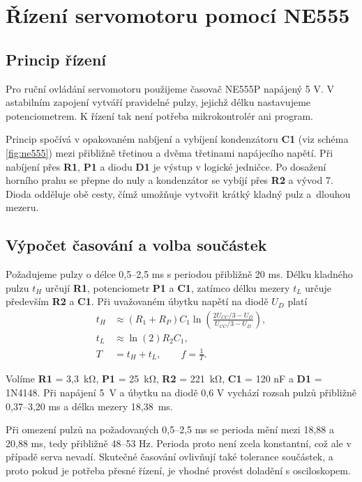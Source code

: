 \chapter{Řízení servomotoru pomocí NE555}
\label{chap:ne555}

\section{Princip řízení}

Pro ruční ovládání servomotoru použijeme časovač NE555P napájený 5 V. V astabilním zapojení vytváří pravidelné pulzy, jejichž délku nastavujeme potenciometrem. K řízení tak není potřeba mikrokontrolér ani program.~\cite{servo555prakticky,ne555}

Princip spočívá v opakovaném nabíjení a vybíjení kondenzátoru \textbf{C1} (viz schéma \ref{fig:ne555}) mezi přibližně třetinou a dvěma třetinami napájecího napětí. Při nabíjení přes \textbf{R1}, \textbf{P1} a diodu \textbf{D1} je výstup v logické jedničce. Po dosažení horního prahu se přepne do nuly a kondenzátor se vybíjí přes \textbf{R2} a vývod 7. Dioda odděluje obě cesty, čímž umožňuje vytvořit krátký kladný pulz a~dlouhou mezeru.~\cite{ne555}

\section{Výpočet časování a volba součástek}

Požadujeme pulzy o délce 0,5--2,5 ms s periodou přibližně 20 ms. Délku kladného pulzu $t_H$ určují \textbf{R1}, potenciometr \textbf{P1} a \textbf{C1}, zatímco délku mezery $t_L$ určuje především \textbf{R2} a \textbf{C1}. Při uvažovaném úbytku napětí na diodě $U_D$ platí
\begin{align}
 t_H&\approx(R_1+R_P)C_1
 \ln\!\left(\frac{2U_{CC}/3-U_D}{U_{CC}/3-U_D}\right),\\
 t_L&\approx\ln(2)R_2C_1,\\
 T&=t_H+t_L,\qquad f=\frac{1}{T}.
\end{align}

Volíme \textbf{R1} = 3,3~k\si{\ohm}, \textbf{P1} = 25~k\si{\ohm}, \textbf{R2} = 221~k\si{\ohm}, \textbf{C1} = 120 nF a \textbf{D1} = 1N4148. Při napájení 5~V a úbytku na diodě 0,6 V vychází rozsah pulzů přibližně 0,37--3,20 ms a délka mezery 18,38~ms.

Při omezení pulzů na požadovaných 0,5--2,5 ms se perioda mění mezi 18,88 a 20,88 ms, tedy přibližně 48--53 Hz. Perioda proto není zcela konstantní, což ale v případě serva nevadí. Skutečné časování ovlivňují také tolerance součástek, a proto pokud je potřeba přesné řízení, je vhodné provést doladění s osciloskopem.

